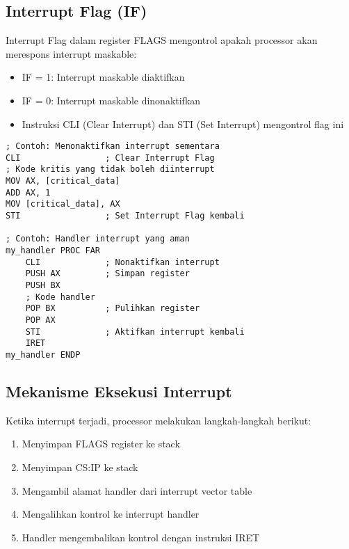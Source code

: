 \documentclass[../main.tex]{subfiles}
\begin{document}
        \subsection{Interrupt Flag (IF)}
            Interrupt Flag dalam register FLAGS mengontrol apakah processor akan merespons interrupt maskable:
            \begin{itemize}
                \item IF = 1: Interrupt maskable diaktifkan
                \item IF = 0: Interrupt maskable dinonaktifkan
                \item Instruksi CLI (Clear Interrupt) dan STI (Set Interrupt) mengontrol flag ini
            \end{itemize}

            \begin{lstlisting}[language={[x86masm]Assembler}, caption=Contoh Penggunaan CLI dan STI, label={lst:cli-sti}]
; Contoh: Menonaktifkan interrupt sementara
CLI                 ; Clear Interrupt Flag
; Kode kritis yang tidak boleh diinterrupt
MOV AX, [critical_data]
ADD AX, 1
MOV [critical_data], AX
STI                 ; Set Interrupt Flag kembali

; Contoh: Handler interrupt yang aman
my_handler PROC FAR
    CLI             ; Nonaktifkan interrupt
    PUSH AX         ; Simpan register
    PUSH BX
    ; Kode handler
    POP BX          ; Pulihkan register
    POP AX
    STI             ; Aktifkan interrupt kembali
    IRET
my_handler ENDP
            \end{lstlisting}

        \subsection{Mekanisme Eksekusi Interrupt}
            Ketika interrupt terjadi, processor melakukan langkah-langkah berikut:
            \begin{enumerate}
                \item Menyimpan FLAGS register ke stack
                \item Menyimpan CS:IP ke stack
                \item Mengambil alamat handler dari interrupt vector table
                \item Mengalihkan kontrol ke interrupt handler
                \item Handler mengembalikan kontrol dengan instruksi IRET
            \end{enumerate}
\end{document}
